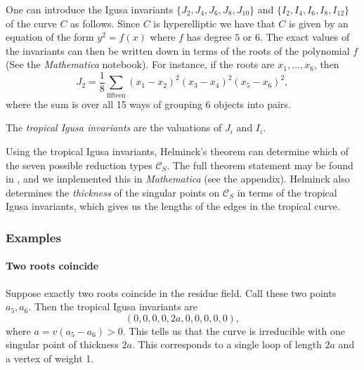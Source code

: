 One can introduce the Igusa invariants $ \{J_2, J_4, J_6, J_8, J_{10}\}$ and $\{I_2, I_4, I_6, I_8, I_{12}\}$ of the curve $C$ as follows. Since $C$ is hyperelliptic we have that $C$ is given by an equation of the form $y^2 = f(x)$ where $f$ has degree $5$ or $6$. The exact values of the invariants can then be written down in terms of the roots of the polynomial $f$ (See the \emph{Mathematica} notebook). For instance, if the roots are $x_1, \ldots, x_6$, then
$$
J_2 = \frac{1}{8} \sum_{\text{fifteen}} (x_1-x_2)^2(x_3-x_4)^2(x_5-x_6)^2,
$$
where the sum is over all 15 ways of grouping 6 objects into pairs.

\begin{defn} The \emph{tropical Igusa invariants} are the valuations of $J_i$ and $I_i$. 
\end{defn}

Using the tropical Igusa invariants, Helminck's theorem can determine which of the seven possible reduction types $\mathcal{C}_S$. The full theorem statement may be found in \cite{masters}, and we implemented this in \emph{Mathematica} (see the appendix). Helminck also determines the \emph{thickness} of the singular points on $\mathcal{C}_S$ in terms of the tropical Igusa invariants, which gives us the lengths of the edges in the tropical curve.

\subsubsection{Examples}

\paragraph{Two roots coincide}
\label{example1}

Suppose exactly two roots coincide in the residue field.
Call these two points $a_5,a_6$. Then the tropical Igusa invariants are
$$
(0, 0, 0, 0, 2a, 0, 0, 0, 0, 0),
$$
where $a = v(a_5-a_6)>0$.
This tells us that the curve is irreducible with one singular point of thickness $2a$. This corresponds to a single loop of length $2a$ and a vertex of weight 1. \\

